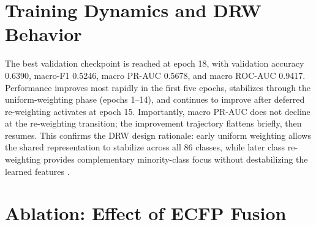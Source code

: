\documentclass[11pt,a4paper]{report}
\begin{document}
\begin{table}[H]
\centering
\caption{Fold-wise test performance of the best-performing cold-drug baseline (GAT+ECFP+LA+DRW).}
\label{tab:fold_results}
\end{table}

\section{Training Dynamics and DRW Behavior}

The best validation checkpoint is reached at epoch 18, with validation accuracy 0.6390, macro-F1 0.5246, macro PR-AUC 0.5678, and macro ROC-AUC 0.9417. Performance improves most rapidly in the first five epochs, stabilizes through the uniform-weighting phase (epochs 1--14), and continues to improve after deferred re-weighting activates at epoch 15. Importantly, macro PR-AUC does not decline at the re-weighting transition; the improvement trajectory flattens briefly, then resumes. This confirms the DRW design rationale: early uniform weighting allows the shared representation to stabilize across all 86 classes, while later class re-weighting provides complementary minority-class focus without destabilizing the learned features \cite{cao2019ldam}.

\section{Ablation: Effect of ECFP Fusion}
\end{document}
